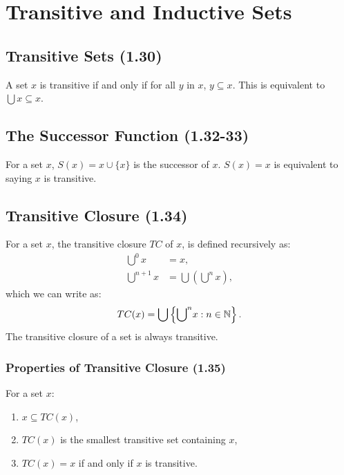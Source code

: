 \section{Transitive and Inductive Sets}

\subsection{Transitive Sets (1.30)} \label{1.30}

A set $x$ is transitive if and only if
for all $y$ in $x$, $y \subseteq x$.
This is equivalent to $\bigcup x \subseteq x$.

\subsection{The Successor Function (1.32-33)} \label{1.32} \label{1.33}

For a set $x$, $S(x) = x \cup \{x\}$ is the successor of $x$.
$S(x) = x$ is equivalent to saying $x$ is transitive.

\subsection{Transitive Closure (1.34)} \label{1.34}

For a set $x$, the transitive closure $TC$ of $x$, is defined recursively as: 
\begin{align*}
    {\bigcup}^0 x &= x, \\
    {\bigcup}^{n + 1} x &= \bigcup\left({\bigcup}^n x\right),
\end{align*} which we can write as: \begin{align*}
    TC(x) = \bigcup\left\{{\bigcup}^n x : n \in \mathbb{N}\right\}.
\end{align*} The transitive closure of a set is always transitive.

\subsubsection{Properties of Transitive Closure (1.35)} \label{1.35}

For a set $x$: \begin{enumerate}
    \item $x \subseteq TC(x)$,
    \item $TC(x)$ is the smallest transitive set containing $x$,
    \item $TC(x) = x$ if and only if $x$ is transitive.
\end{enumerate}

